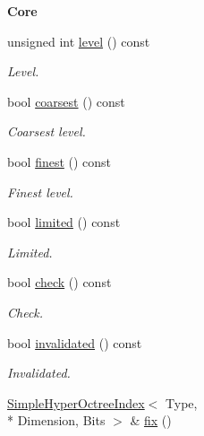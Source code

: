 \begin{Indent}{\bf Core}\par
\begin{DoxyCompactItemize}
\item 
unsigned int \hyperlink{exceptionmagrathea_1_1SimpleHyperOctreeIndex_a64fd3a897eef3ab9d2795178cdac96f6}{level} () const 
\begin{DoxyCompactList}\small\item\em Level. \end{DoxyCompactList}\item 
bool \hyperlink{exceptionmagrathea_1_1SimpleHyperOctreeIndex_af82507e966585788c405c9ec7c1b66a4}{coarsest} () const 
\begin{DoxyCompactList}\small\item\em Coarsest level. \end{DoxyCompactList}\item 
bool \hyperlink{exceptionmagrathea_1_1SimpleHyperOctreeIndex_a33bd336a04296967fd45dfeeaa2a4165}{finest} () const 
\begin{DoxyCompactList}\small\item\em Finest level. \end{DoxyCompactList}\item 
bool \hyperlink{exceptionmagrathea_1_1SimpleHyperOctreeIndex_a4ebf328c6f2b015bc95957942d9adb26}{limited} () const 
\begin{DoxyCompactList}\small\item\em Limited. \end{DoxyCompactList}\item 
bool \hyperlink{exceptionmagrathea_1_1SimpleHyperOctreeIndex_ab9a5d6248a8c0628240d578a8b6809c1}{check} () const 
\begin{DoxyCompactList}\small\item\em Check. \end{DoxyCompactList}\item 
bool \hyperlink{exceptionmagrathea_1_1SimpleHyperOctreeIndex_a887b03435cfa67cb86fe74b937275b94}{invalidated} () const 
\begin{DoxyCompactList}\small\item\em Invalidated. \end{DoxyCompactList}\item 
\hyperlink{exceptionmagrathea_1_1SimpleHyperOctreeIndex}{Simple\-Hyper\-Octree\-Index}$<$ Type, \\*
Dimension, Bits $>$ \& \hyperlink{exceptionmagrathea_1_1SimpleHyperOctreeIndex_af877956ad4d0ec43433a755174b9c067}{fix} ()

\end{DoxyCompactItemize}
\end{Indent}
